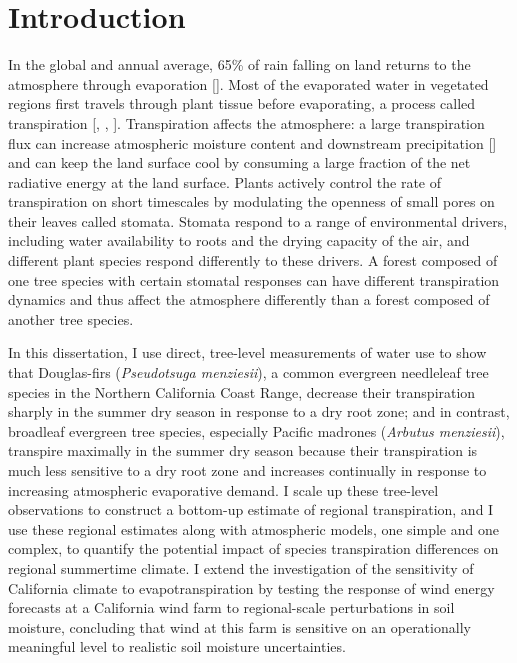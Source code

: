\chapter{Introduction}
\label{c.intro}

In the global and annual average, 65\% of rain falling on land returns to the atmosphere through evaporation [\cite{trenberth2007}].  Most of the evaporated water in vegetated regions first travels through plant tissue before evaporating, a process called transpiration [\cite{wilson2001comparison}, \cite{dirmeyer2005second}, \cite{jasechko2013terrestrial}].  Transpiration affects the atmosphere: a large transpiration flux can increase atmospheric moisture content and downstream precipitation [\cite{ISI:A1996VD58700003}] and can keep the land surface cool by consuming a large fraction of the net radiative energy at the land surface.  Plants actively control the rate of transpiration on short timescales by modulating the openness of small pores on their leaves called stomata.  Stomata respond to a range of environmental drivers, including water availability to roots and the drying capacity of the air, and different plant species respond differently to these drivers.  A forest composed of one tree species with certain stomatal responses can have different transpiration dynamics and thus affect the atmosphere differently than a forest composed of another tree species.  

In this dissertation, I use direct, tree-level measurements of water use to show that Douglas-firs (\textit{Pseudotsuga menziesii}), a common evergreen needleleaf tree species in the Northern California Coast Range, decrease their transpiration sharply in the summer dry season in response to a dry root zone; and in contrast, broadleaf evergreen tree species, especially Pacific madrones (\textit{Arbutus menziesii}), transpire maximally in the summer dry season because their transpiration is much less sensitive to a dry root zone and increases continually in response to increasing atmospheric evaporative demand.  I scale up these tree-level observations to construct a bottom-up estimate of regional transpiration, and I use these regional estimates along with atmospheric models, one simple and one complex, to quantify the potential impact of species transpiration differences on regional summertime climate.  I extend the investigation of the sensitivity of California climate to evapotranspiration by testing the response of wind energy forecasts at a California wind farm to regional-scale perturbations in soil moisture, concluding that wind at this farm is sensitive on an operationally meaningful level to realistic soil moisture uncertainties.

